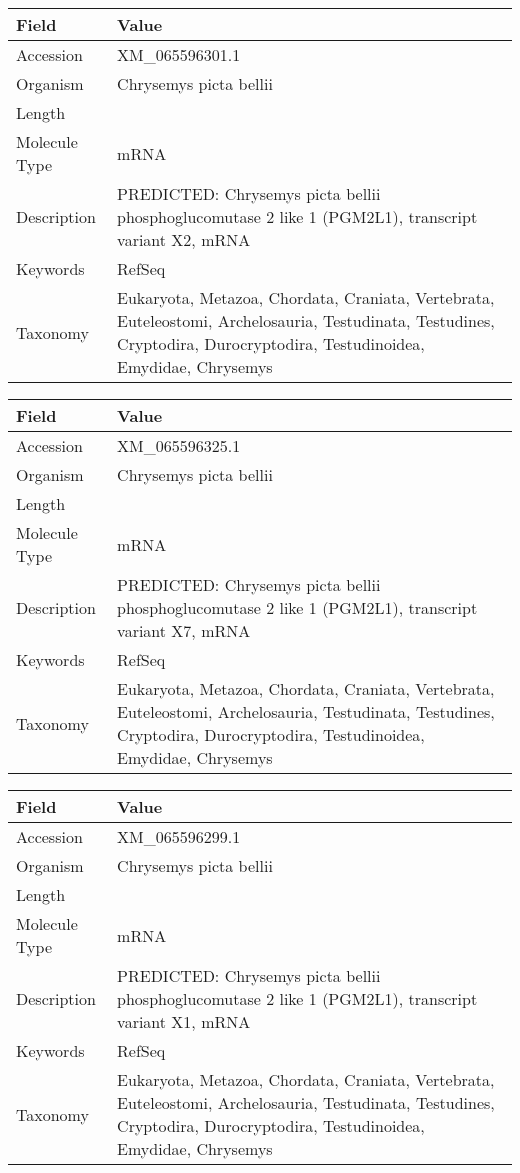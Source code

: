 \documentclass[10pt]{article}
\begin{document}
\vspace{1em}
{\footnotesize
\begin{longtable}{>{\raggedright\arraybackslash}p{4.5cm} >{\raggedright\arraybackslash}p{11.5cm}}
\textbf{Field} & \textbf{Value} \\
\hline
Accession & XM\_065596301.1 \\
Organism & Chrysemys picta bellii \\
Length & 8158 \\
Molecule Type & mRNA \\
Description & PREDICTED: Chrysemys picta bellii phosphoglucomutase 2 like 1 (PGM2L1), transcript variant X2, mRNA \\
Keywords & RefSeq \\
Taxonomy & Eukaryota, Metazoa, Chordata, Craniata, Vertebrata, Euteleostomi, Archelosauria, Testudinata, Testudines, Cryptodira, Durocryptodira, Testudinoidea, Emydidae, Chrysemys \\
\end{longtable}
}

\vspace{1em}
{\footnotesize
\begin{longtable}{>{\raggedright\arraybackslash}p{4.5cm} >{\raggedright\arraybackslash}p{11.5cm}}
\textbf{Field} & \textbf{Value} \\
\hline
Accession & XM\_065596325.1 \\
Organism & Chrysemys picta bellii \\
Length & 13042 \\
Molecule Type & mRNA \\
Description & PREDICTED: Chrysemys picta bellii phosphoglucomutase 2 like 1 (PGM2L1), transcript variant X7, mRNA \\
Keywords & RefSeq \\
Taxonomy & Eukaryota, Metazoa, Chordata, Craniata, Vertebrata, Euteleostomi, Archelosauria, Testudinata, Testudines, Cryptodira, Durocryptodira, Testudinoidea, Emydidae, Chrysemys \\
\end{longtable}
}

\vspace{1em}
{\footnotesize
\begin{longtable}{>{\raggedright\arraybackslash}p{4.5cm} >{\raggedright\arraybackslash}p{11.5cm}}
\textbf{Field} & \textbf{Value} \\
\hline
Accession & XM\_065596299.1 \\
Organism & Chrysemys picta bellii \\
Length & 8059 \\
Molecule Type & mRNA \\
Description & PREDICTED: Chrysemys picta bellii phosphoglucomutase 2 like 1 (PGM2L1), transcript variant X1, mRNA \\
Keywords & RefSeq \\
Taxonomy & Eukaryota, Metazoa, Chordata, Craniata, Vertebrata, Euteleostomi, Archelosauria, Testudinata, Testudines, Cryptodira, Durocryptodira, Testudinoidea, Emydidae, Chrysemys \\
\end{longtable}
}
\end{document}
